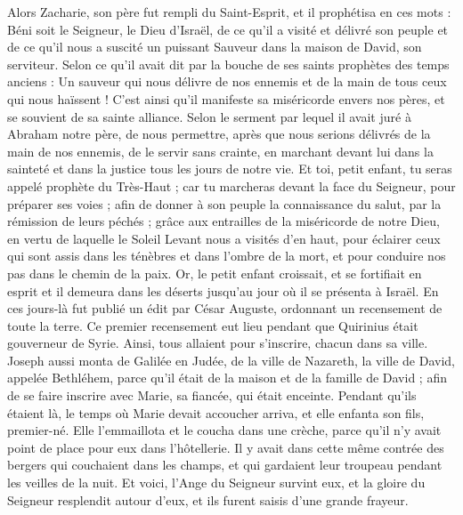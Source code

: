 \begin{multicols}{2}
Alors Zacharie, son père fut rempli du Saint-Esprit, et il prophétisa en ces mots :
Béni soit le Seigneur, le Dieu d'Israël, de ce qu'il a visité et délivré son peuple
et de ce qu'il nous a suscité un puissant Sauveur dans la maison de David, son serviteur.
Selon ce qu'il avait dit par la bouche de ses saints prophètes des temps anciens :
Un sauveur qui nous délivre de nos ennemis et de la main de tous ceux qui nous haïssent !
C’est ainsi qu’il manifeste sa miséricorde envers nos pères, et se souvient de sa sainte alliance.
Selon le serment par lequel il avait juré à Abraham notre père,
de nous permettre, après que nous serions délivrés de la main de nos ennemis, de le servir sans crainte,
en marchant devant lui dans la sainteté et dans la justice tous les jours de notre vie.
Et toi, petit enfant, tu seras appelé prophète du Très-Haut ; car tu marcheras devant la face du Seigneur, pour préparer ses voies ;
afin de donner à son peuple la connaissance du salut, par la rémission de leurs péchés ;
grâce aux entrailles de la miséricorde de notre Dieu, en vertu de laquelle le Soleil Levant nous a visités d’en haut,
pour éclairer ceux qui sont assis dans les ténèbres et dans l'ombre de la mort, et pour conduire nos pas dans le chemin de la paix.
Or, le petit enfant croissait, et se fortifiait en esprit et il demeura dans les déserts jusqu'au jour où il se présenta à Israël.
\VerseOne{}En ces jours-là fut publié un édit par César Auguste, ordonnant un recensement de toute la terre.
Ce premier recensement eut lieu pendant que Quirinius était gouverneur de Syrie.
Ainsi, tous allaient pour s’inscrire, chacun dans sa ville.
Joseph aussi monta de Galilée en Judée, de la ville de Nazareth, la ville de David, appelée Bethléhem, parce qu’il était de la maison et de la famille de David ;
afin de se faire inscrire avec Marie, sa fiancée, qui était enceinte.
Pendant qu’ils étaient là, le temps où Marie devait accoucher arriva,
et elle enfanta son fils, premier-né. Elle l'emmaillota et le coucha dans une crèche, parce qu'il n'y avait point de place pour eux dans l'hôtellerie.
Il y avait dans cette même contrée des bergers qui couchaient dans les champs, et qui gardaient leur troupeau pendant les veilles de la nuit.
Et voici, l'Ange du Seigneur survint eux, et la gloire du Seigneur resplendit autour d'eux, et ils furent saisis d'une grande frayeur.

\end{multicols}
